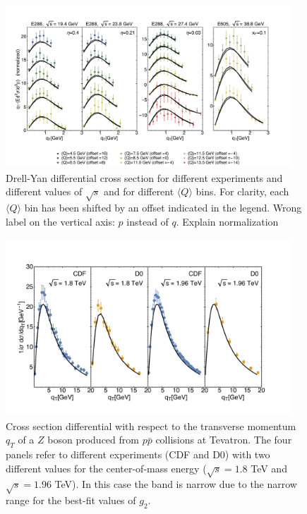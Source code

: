 \documentclass[aps,preprintnumbers,showpacs,nofootinbib,superscriptaddress,floatfix]{revtex4}
\newcommand{\AS}[1]{{\textcolor[rgb]{1,0,1}{#1}}}
\begin{document}
\begin{figure}[h!]
\centering
\includegraphics[width=0.95\textwidth]{plots/DY_SCIplot_flINDEP.pdf}
\caption{Drell-Yan differential cross section for different experiments and
  different values of $\sqrt{s}$ and for different $\langle Q \rangle$
  bins. For clarity, each $\langle Q \rangle$  bin has been shifted by an
  offset indicated in the legend. \AS{Wrong label on the vertical axis: $p$
    instead of $q$. Explain normalization}}
\label{f:DY_panel}
\end{figure}
\begin{figure}[h!]
\begin{center}
\includegraphics[width=0.95\textwidth]{plots/Z_SCIplot_flINDEP.pdf}
\end{center}
\caption{Cross section differential with respect to the transverse momentum $q_T$ of a $Z$ boson produced from $p\bar{p}$ collisions at Tevatron. The four panels refer to different experiments (CDF and D$0$) with two different values for the center-of-mass energy ($\sqrt{s} = 1.8$ TeV and $\sqrt{s}=1.96$ TeV). In this case the band is narrow due to the narrow range for the best-fit values of $g_2$.} 
\label{f:Z_qT}
\end{figure}
\end{document}
